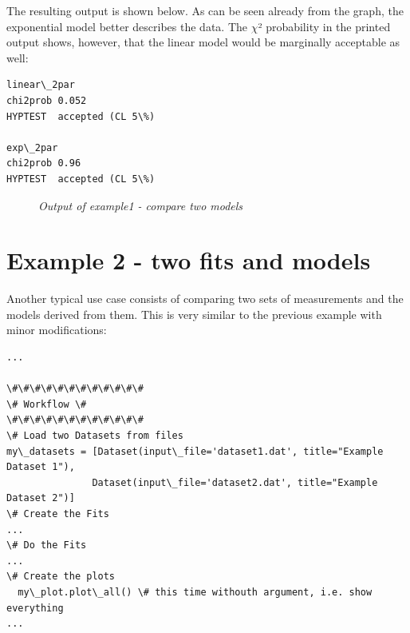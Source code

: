 \documentclass[a4paper,10pt,english]{sphinxmanual}
\begin{document}
The resulting output is shown below. As can be seen already
from the graph, the exponential model better describes the
data. The \(\chi\)² probability in the printed output shows, however,
that the linear model would be marginally acceptable as well:

\begin{Verbatim}[commandchars=\\\{\}]
linear\_2par
chi2prob 0.052
HYPTEST  accepted (CL 5\%)

exp\_2par
chi2prob 0.96
HYPTEST  accepted (CL 5\%)
\end{Verbatim}
\begin{figure}[htbp]
\centering
\capstart

\caption{\emph{Output of example1 - compare two models}}\end{figure}


\section{Example 2 - two fits and models}
\label{index:example-2-two-fits-and-models}
Another typical use case consists of comparing two sets
of measurements and the models derived from them. This is
very similar to the previous example with minor
modifications:

\begin{Verbatim}[commandchars=\\\{\}]
...

\#\#\#\#\#\#\#\#\#\#\#\#
\# Workflow \#
\#\#\#\#\#\#\#\#\#\#\#\#
\# Load two Datasets from files
my\_datasets = [Dataset(input\_file='dataset1.dat', title="Example Dataset 1"),
               Dataset(input\_file='dataset2.dat', title="Example Dataset 2")]
\# Create the Fits
...
\# Do the Fits
...
\# Create the plots
  my\_plot.plot\_all() \# this time withouth argument, i.e. show everything
...
\end{Verbatim}
\end{document}
